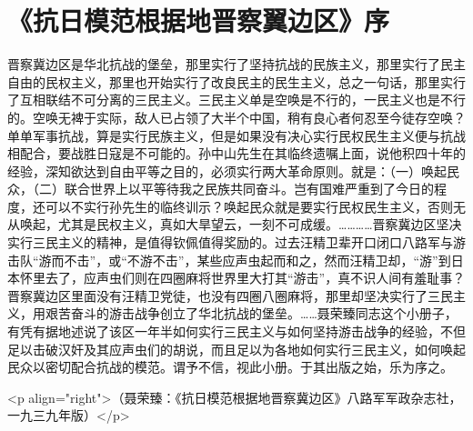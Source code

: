 \section[《抗日模范根据地晋察翼边区》序（一九三九年三月二日）]{《抗日模范根据地晋察翼边区》序}


晋察冀边区是华北抗战的堡垒，那里实行了坚持抗战的民族主义，那里实行了民主自由的民权主义，那里也开始实行了改良民主的民生主义，总之一句话，那里实行了互相联结不可分离的三民主义。三民主义单是空唤是不行的，一民主义也是不行的。空唤无裨于实际，敌人已占领了大半个中国，稍有良心者何忍至今徒存空唤？单单军事抗战，算是实行民族主义，但是如果没有决心实行民权民生主义便与抗战相配合，要战胜日寇是不可能的。孙中山先生在其临终遗嘱上面，说他积四十年的经验，深知欲达到自由平等之目的，必须实行两大革命原则。就是：（一）唤起民众，（二）联合世界上以平等待我之民族共同奋斗。岂有国难严重到了今日的程度，还可以不实行孙先生的临终训示？唤起民众就是要实行民权民生主义，否则无从唤起，尤其是民权主义，真如大旱望云，一刻不可成缓。…………晋察冀边区坚决实行三民主义的精神，是值得钦佩值得奖励的。过去汪精卫辈开口闭口八路军与游击队“游而不击”，或“不游不击”，某些应声虫起而和之，然而汪精卫却，“游”到日本怀里去了，应声虫们则在四圈麻将世界里大打其“游击”，真不识人间有羞耻事？晋察冀边区里面没有汪精卫党徒，也没有四圈八圈麻将，那里却坚决实行了三民主义，用艰苦奋斗的游击战争创立了华北抗战的堡垒。……聂荣臻同志这个小册子，有凭有据地述说了该区一年半如何实行三民主义与如何坚持游击战争的经验，不但足以击破汉奸及其应声虫们的胡说，而且足以为各地如何实行三民主义，如何唤起民众以密切配合抗战的模范。谓予不信，视此小册。于其出版之始，乐为序之。

<p align="right">（聂荣臻：《抗日模范根据地晋察冀边区》八路军军政杂志社，一九三九年版）</p>

